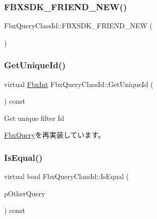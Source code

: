 \subsubsection{\texorpdfstring{F\+B\+X\+S\+D\+K\+\_\+\+F\+R\+I\+E\+N\+D\+\_\+\+N\+E\+W()}{FBXSDK\_FRIEND\_NEW()}}
{\footnotesize\ttfamily Fbx\+Query\+Class\+Id\+::\+F\+B\+X\+S\+D\+K\+\_\+\+F\+R\+I\+E\+N\+D\+\_\+\+N\+EW (\begin{DoxyParamCaption}{ }\end{DoxyParamCaption})}

\mbox{\label{class_fbx_query_class_id_a9460258f2525b83b7e81f87a3bcc2c61}} 
\subsubsection{\texorpdfstring{Get\+Unique\+Id()}{GetUniqueId()}}
{\footnotesize\ttfamily virtual \hyperlink{fbxtypes_8h_a088fa96de3b0b3ea69f0f6afef525dfb}{Fbx\+Int} Fbx\+Query\+Class\+Id\+::\+Get\+Unique\+Id (\begin{DoxyParamCaption}{ }\end{DoxyParamCaption}) const\hspace{0.3cm}{\ttfamily [virtual]}}



Get unique filter Id 



\hyperlink{class_fbx_query_ac7daae8f6fa83cd97ae24e93d7b4dc29}{Fbx\+Query}を再実装しています。

\mbox{\label{class_fbx_query_class_id_ac20046270f87a7bb84fbf776980431af}} 
\subsubsection{\texorpdfstring{Is\+Equal()}{IsEqual()}}
{\footnotesize\ttfamily virtual bool Fbx\+Query\+Class\+Id\+::\+Is\+Equal (\begin{DoxyParamCaption}\item[{\hyperlink{class_fbx_query}{Fbx\+Query} $\ast$}]{p\+Other\+Query }\end{DoxyParamCaption}) const\hspace{0.3cm}{\ttfamily [virtual]}}

